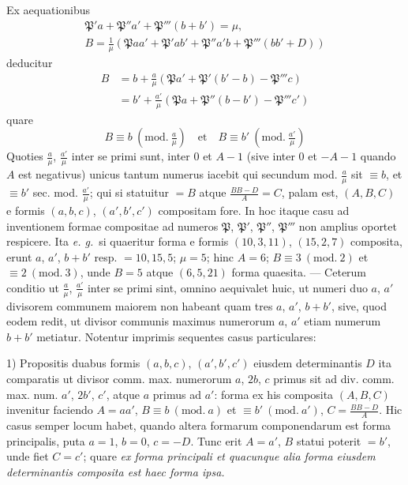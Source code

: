 Ex aequationibus
\[
\begin{gathered}\mathfrak{P}'a+\mathfrak{P}''a'+\mathfrak{P}'''(b+b')=\mu,\\
B=\frac{1}{\mu}(\mathfrak{P}aa'+\mathfrak{P}'ab'+\mathfrak{P}''a'b+\mathfrak{P}'''(bb'+D))\end{gathered}
\]
deducitur
\[
\begin{aligned}B&=b+\frac{a}{\mu}(\mathfrak{P}a'+\mathfrak{P}'(b'-b)-\mathfrak{P}'''c)\\&=b'+\frac{a'}{\mu}(\mathfrak{P}a+\mathfrak{P}''(b-b')-\mathfrak{P}'''c')\end{aligned}
\]
quare
\[
B\equiv b\ (\mathrm{mod.}\ \tfrac{a}{\mu})\quad\text{et}\quad B\equiv b'\ (\mathrm{mod.}\ \tfrac{a'}{\mu})
\]
Quoties $\frac{a}{\mu}$, $\frac{a'}{\mu}$ inter se primi sunt, inter $0$ et $A-1$ (sive inter $0$ et $-A-1$ quando $A$ est negativus) unicus tantum numerus iacebit qui secundum mod. $\frac{a}{\mu}$ sit $\equiv b$, et $\equiv b'$ sec. mod. $\frac{a'}{\mu}$; qui si statuitur $=B$ atque $\frac{BB-D}{A}=C$, palam est, $(A,B,C)$ e formis $(a,b,c)$, $(a',b',c')$ compositam fore. In hoc itaque casu ad inventionem formae compositae ad numeros $\mathfrak{P}$, $\mathfrak{P}'$, $\mathfrak{P}''$, $\mathfrak{P}'''$ non amplius oportet respicere. Ita \textit{e. g.}\ si quaeritur forma e formis $(10,3,11)$, $(15,2,7)$ composita, erunt $a$, $a'$, $b+b'$ resp. $=10,15,5$; $\mu=5$; hinc $A=6$; $B\equiv3\ (\mathrm{mod.}\ 2)$ et $\equiv2\ (\mathrm{mod.}\ 3)$, unde $B=5$ atque $(6,5,21)$ forma quaesita. --- Ceterum conditio ut $\frac{a}{\mu}$, $\frac{a'}{\mu}$ inter se primi sint, omnino aequivalet huic, ut numeri duo $a$, $a'$ divisorem communem maiorem non habeant quam tres $a$, $a'$, $b+b'$, sive, quod eodem redit, ut divisor communis maximus numerorum $a$, $a'$ etiam numerum $b+b'$ metiatur. Notentur imprimis sequentes casus particulares:

1) Propositis duabus formis $(a,b,c)$, $(a',b',c')$ eiusdem determinantis $D$ ita comparatis ut divisor comm. max. numerorum $a$, $2b$, $c$ primus sit ad div. comm. max. num. $a'$, $2b'$, $c'$, atque $a$ primus ad $a'$: forma ex his composita $(A,B,C)$ invenitur faciendo $A=aa'$, $B\equiv b\ (\mathrm{mod.}\ a)$ et $\equiv b'\ (\mathrm{mod.}\ a')$, $C=\frac{BB-D}{A}$. Hic casus semper locum habet, quando altera formarum componendarum est forma principalis, puta $a=1$, $b=0$, $c=-D$. Tunc erit $A=a'$, $B$ statui poterit
$=b'$, unde fiet $C=c'$; quare \textit{ex forma principali et quacunque alia forma eiusdem determinantis composita est haec forma ipsa.}

